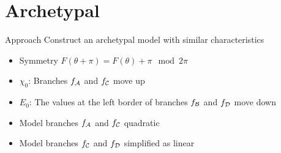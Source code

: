 \section{Archetypal}

\begin{frame}{Approach}
	\vspace{-1em}
	Construct an archetypal model with similar characteristics
	\pause
	\begin{itemize}
		\item Symmetry $F(\theta + \pi) = F(\theta) + \pi \mod 2\pi$ \hfill \cite{akyuz2022} \pause
		\item $\chi_0$: Branches $f_{\mathcal{A}}$ and $f_{\mathcal{C}}$ move up \pause
		\item $E_0$: The values at the left border of branches $f_{\mathcal{B}}$ and $f_{\mathcal{D}}$ move down \pause
		\item Model branches $f_{\mathcal{A}}$ and $f_{\mathcal{C}}$ quadratic \pause
		\item Model branches $f_{\mathcal{C}}$ and $f_{\mathcal{D}}$ simplified as linear
	\end{itemize}

	\begin{figure}
	\end{figure}
\end{frame}

